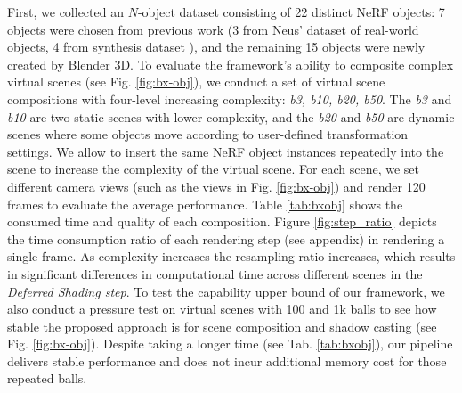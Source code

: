 \documentclass[letterpaper]{article} %
\begin{document}
First, we collected an $N$-object dataset consisting of 22 distinct NeRF objects: 7 objects were chosen from previous work (3 from Neus' dataset of real-world objects, 4 from synthesis dataset \cite{mildenhall2020nerf,zhang2022modeling,verbin2022ref}), and the remaining 15 objects were newly created by Blender 3D. To evaluate the framework's ability to composite complex virtual scenes (see Fig. \ref{fig:bx-obj}), we
conduct a set of virtual scene compositions with four-level increasing complexity: \textit{b3, b10, b20, b50}.
The \textit{b3} and \textit{b10} are two static scenes with lower complexity, and the \textit{b20} and \textit{b50} are dynamic scenes where some objects move according to user-defined transformation settings. We allow to insert the same NeRF object instances repeatedly into the scene to increase the complexity of the virtual scene.
For each scene, we set different camera views (such as the views in Fig. \ref{fig:bx-obj}) and render 120 frames to evaluate the average performance. Table \ref{tab:bxobj} shows the consumed time and quality of each composition.
Figure \ref{fig:step_ratio} depicts the time consumption ratio of each rendering step (see appendix) in rendering a single frame. As complexity increases the resampling ratio increases, which results in significant differences in computational time across different scenes in the \textit{Deferred Shading step}.
To test the capability upper bound of our framework, we also conduct a pressure test on virtual scenes with 100 and 1k balls to see how stable the proposed approach is for scene composition and shadow casting (see Fig. \ref{fig:bx-obj}). Despite taking a longer time (see Tab. \ref{tab:bxobj}), our pipeline delivers stable performance and does not incur additional memory cost for those repeated balls.
\end{document}
